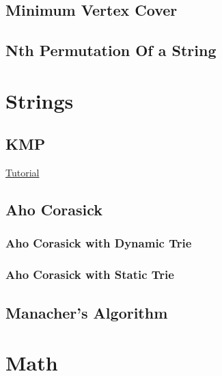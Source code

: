 \documentclass[11pt]{report}
\begin{document}


\section{Minimum Vertex Cover}

\section{Nth Permutation Of a String}


\chapter{Strings}
\section{KMP}
\href{https://tanvir002700.wordpress.com/2015/03/03/kmp-knuth-morris-pratt-algorithm/}{Tutorial}

\section{Aho Corasick}
\subsection{Aho Corasick with Dynamic Trie}

\subsection{Aho Corasick with Static Trie}

\section{Manacher's Algorithm}



\chapter{Math}
\end{document}
